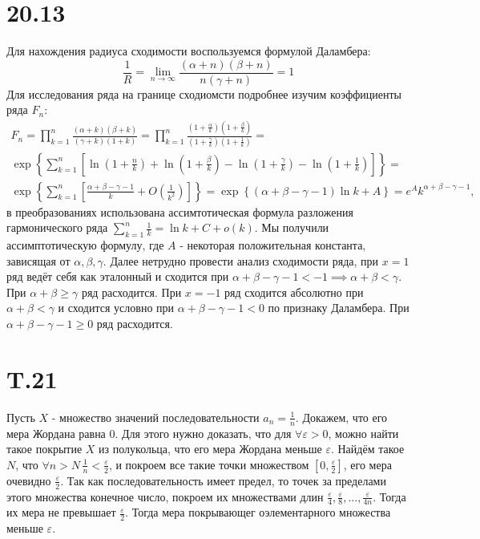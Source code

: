 \documentclass[12pt]{article}
\begin{document}
\section{20.13}
Для нахождения радиуса сходимости воспользуемся формулой Даламбера:
\[
    \frac{1}{R} = \lim_{n \to \infty} \frac{(\alpha + n)(\beta + n)}{n (\gamma + n)} = 1
\]
Для исследования ряда на границе сходиомсти подробнее изучим коэффициенты ряда $F_n$:
\[
    \begin{split}
        F_n = \prod_{k = 1}^{n} \frac{(\alpha + k)(\beta + k)}{(\gamma + k)(1 + k)} =
        \prod_{k = 1}^{n} \frac{(1 + \frac{\alpha}{k})(1 + \frac{\beta}{k})}{(1 + \frac{\gamma}{k})(1 + \frac{1}{k})} = \\
        \exp \left\{ \sum_{k=1}^{n} \left[ \ln \left( 1 + \frac{n}{k} \right) + \ln \left( 1 + \frac{\beta }{k} \right) - \ln \left( 1 + \frac{\gamma}{k} \right) - \ln \left( 1 + \frac{1}{k} \right) \right]  \right\}  = \\
        \exp \left\{ \sum_{k=1}^{n} \left[ \frac{\alpha + \beta - \gamma - 1}{k} + O\left( \frac{1}{k^2} \right) \right]  \right\} =
        \exp \left\{ (\alpha + \beta - \gamma - 1)\ln k + A \right\} = e^A k^{\alpha + \beta - \gamma - 1},
    \end{split}
\]
в преобразованиях использована ассимтотическая формула разложения гармонического ряда $\sum_{k=1}^{n} \frac{1}{k} = \ln k + C + o(k)$.
Мы получили ассимптотическую формулу, где $A$ - некоторая положительная константа, зависящая от $\alpha, \beta, \gamma$.
Далее нетрудно провести анализ сходимости ряда, при $x = 1$ ряд ведёт себя как эталонный и сходится при $\alpha + \beta - \gamma - 1 < -1 \implies \alpha + \beta < \gamma$.
При $\alpha + \beta \geq \gamma$ ряд расходится. При $x = -1$ ряд сходится абсолютно при $\alpha + \beta < \gamma$ и сходится условно при $\alpha + \beta - \gamma - 1 < 0$ по признаку Даламбера.
При $\alpha + \beta - \gamma - 1 \geq 0$ ряд расходится.
\section{T.21}
Пусть $X$ - множество значений последовательности $a_n = \frac{1}{n}$. Докажем, что его мера Жордана равна $0$.
Для этого нужно доказать, что для $\forall \varepsilon > 0$, можно найти такое покрытие $X$ из
полукольца, что его мера Жордана меньше $\varepsilon$. Найдём такое $N$, что $\forall n > N \, \frac{1}{n} < \frac{\varepsilon}{2}$,
и покроем все такие точки множеством $[0, \frac{\varepsilon}{2}]$, его мера очевидно $\frac{\varepsilon}{2}$.
Так как последовательность имеет предел, то точек за пределами этого множества конечное число, покроем
их множествами длин $\frac{\varepsilon}{4}, \frac{\varepsilon}{8}, \dots, \frac{\varepsilon}{4n}$. Тогда их мера не превышает $\frac{\varepsilon}{2}$.
Тогда мера покрывающег оэлементарного множества меньше $\varepsilon$.
\end{document}
